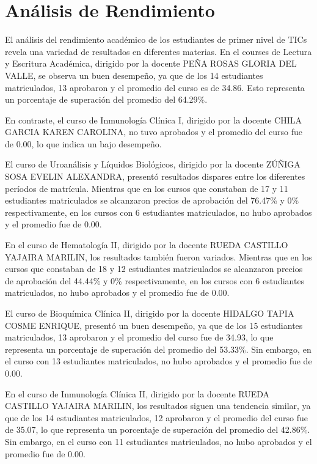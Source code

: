 \vspace{1cm}
\section{Análisis de Rendimiento}
El análisis del rendimiento académico de los estudiantes de primer nivel de TICs revela una variedad de resultados en diferentes materias. En el courses de Lectura y Escritura Académica, dirigido por la docente PEÑA ROSAS GLORIA DEL VALLE, se observa un buen desempeño, ya que de los 14 estudiantes matriculados, 13 aprobaron y el promedio del curso es de 34.86. Esto representa un porcentaje de superación del promedio del 64.29\%.

En contraste, el curso de Inmunología Clínica I, dirigido por la docente CHILA GARCIA KAREN CAROLINA, no tuvo aprobados y el promedio del curso fue de 0.00, lo que indica un bajo desempeño.

El curso de Uroanálisis y Líquidos Biológicos, dirigido por la docente ZÚÑIGA SOSA EVELIN ALEXANDRA, presentó resultados dispares entre los diferentes períodos de matrícula. Mientras que en los cursos que constaban de 17 y 11 estudiantes matriculados se alcanzaron precios de aprobación del 76.47\% y 0\% respectivamente, en los cursos con 6 estudiantes matriculados, no hubo aprobados y el promedio fue de 0.00.

En el curso de Hematología II, dirigido por la docente RUEDA CASTILLO YAJAIRA MARILIN, los resultados también fueron variados. Mientras que en los cursos que constaban de 18 y 12 estudiantes matriculados se alcanzaron precios de aprobación del 44.44\% y 0\% respectivamente, en los cursos con 6 estudiantes matriculados, no hubo aprobados y el promedio fue de 0.00.

El curso de Bioquímica Clínica II, dirigido por la docente HIDALGO TAPIA COSME ENRIQUE, presentó un buen desempeño, ya que de los 15 estudiantes matriculados, 13 aprobaron y el promedio del curso fue de 34.93, lo que representa un porcentaje de superación del promedio del 53.33\%. Sin embargo, en el curso con 13 estudiantes matriculados, no hubo aprobados y el promedio fue de 0.00.

En el curso de Inmunología Clínica II, dirigido por la docente RUEDA CASTILLO YAJAIRA MARILIN, los resultados siguen una tendencia similar, ya que de los 14 estudiantes matriculados, 12 aprobaron y el promedio del curso fue de 35.07, lo que representa un porcentaje de superación del promedio del 42.86\%. Sin embargo, en el curso con 11 estudiantes matriculados, no hubo aprobados y el promedio fue de 0.00.

